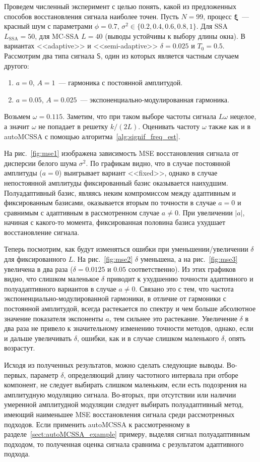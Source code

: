 \documentclass[specialist,
substylefile = spbu_report.rtx,
subf,12pt]{disser}
\theoremstyle{definition}
\begin{document}
Проведем численный эксперимент с целью понять, какой из предложенных способов восстановления сигнала наиболее точен. Пусть $N=99$, процесс $\bm\xi$~--- красный шум с параметрами $\phi=0.7$, $\sigma^2\in\{0.2, 0.4, 0.6, 0.8, 1\}$. Для SSA $L_\text{SSA}=50$, для MC-SSA $L=40$ (выводы устойчивы к выбору длины окна). В вариантах <<adaptive>> и <<semi-adaptive>> $\delta=0.025$ и $T_0=0.5$. Рассмотрим два типа сигнала $\mathsf{S}$, один из которых является частным случаем другого:
\begin{enumerate}
	\item $a=0$, $A=1$~--- гармоника с постоянной амплитудой.
	\item $a=0.05$, $A=0.025$~--- экспоненциально-модулированная гармоника.
\end{enumerate}
Возьмем $\omega=0.115$. Заметим, что при таком выборе частоты сигнала $L \omega$ нецелое, а значит $\omega$ не попадает в решетку $k/(2L)$. Оценивать частоту $\omega$ также как и в autoMCSSA с помощью алгоритма~\ref{alg:signif_freq_est}.

На рис.~\ref{fig:mse1} изображена зависимость MSE восстановления сигнала от дисперсии белого шума $\sigma^2$. По графикам видно, что в случае постоянной амплитуды ($a=0$) выигрывает вариант <<fixed>>, однако в случае непостоянной амплитуды фиксированный базис оказывается наихудшим. Полуадаптивный базис, являясь неким компромиссом между адаптивным и фиксированным базисами, оказывается вторым по точности в случае $a=0$ и сравнимым с адаптивным в рассмотренном случае $a\ne0$. При увеличении $|a|$, начиная с какого-то момента, фиксированная половина базиса ухудшает восстановление сигнала.

Теперь посмотрим, как будут изменяться ошибки при уменьшении/увеличении $\delta$ для фиксированного $L$. На рис.~\ref{fig:mse2} $\delta$ уменьшена, а на рис.~\ref{fig:mse3} увеличена в два раза ($\delta=0.0125$ и $0.05$ соответственно). Из этих графиков видно, что слишком маленькое $\delta$ приводит к ухудшению точности адаптивного и полуадаптивного вариантов в случае $a\ne0$. Связано это с тем, что частота экспоненциально-модулированной гармоники, в отличие от гармоники с постоянной амплитудой, всегда растекается по спектру и чем больше абсолютное значение показателя экспоненты $a$, тем сильнее это растекание. Увеличение $\delta$ в два раза не привело к значительному изменению точности методов, однако, если и дальше увеличивать $\delta$, ошибки, как и в случае слишком маленького $\delta$, опять возрастут.

Исходя из полученных результатов, можно сделать следующие выводы. Во-первых, параметр $\delta$, определяющий длину частотного интервала при отборе компонент, не следует выбирать слишком маленьким, если есть подозрения на амплитудную модуляцию сигнала. Во-вторых, при отсутствии или наличии умеренной амплитудной модуляции следует выбирать полуадаптивный метод, имеющий наименьшее MSE восстановления сигнала среди рассмотренных подходов. Если применить autoMCSSA к рассмотренному в разделе~\ref{sect:autoMCSSA_example} примеру, выделяя сигнал полуадаптивным подходом, то полученная оценка сигнала сравнима с результатом адаптивного подхода.
\end{document}
